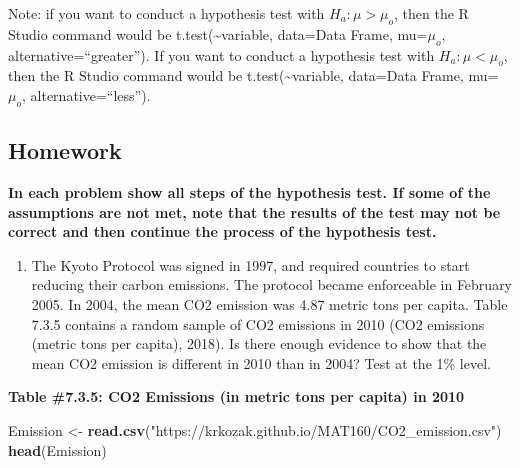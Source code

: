 \documentclass[]{book}
\newenvironment{Shaded}{\begin{snugshade}}{\end{snugshade}}
\newcommand{\KeywordTok}[1]{\textcolor[rgb]{0.13,0.29,0.53}{\textbf{#1}}}
\newcommand{\NormalTok}[1]{#1}
\newcommand{\StringTok}[1]{\textcolor[rgb]{0.31,0.60,0.02}{#1}}
\providecommand{\tightlist}{%
  \setlength{\itemsep}{0pt}\setlength{\parskip}{0pt}}
\begin{document}
Note: if you want to conduct a hypothesis test with \(H_a:\mu>\mu_o\), then the R Studio command would be t.test(\textasciitilde{}variable, data=Data Frame, mu=\(\mu_o\), alternative=``greater''). If you want to conduct a hypothesis test with \(H_a:\mu<\mu_o\), then the R Studio command would be t.test(\textasciitilde{}variable, data=Data Frame, mu=\(\mu_o\), alternative=``less'').

\hypertarget{homework-22}{%
\subsection{Homework}\label{homework-22}}

\textbf{In each problem show all steps of the hypothesis test. If some of the assumptions are not met, note that the results of the test may not be correct and then continue the process of the hypothesis test.}

\begin{enumerate}
\def\labelenumi{\arabic{enumi}.}
\tightlist
\item
  The Kyoto Protocol was signed in 1997, and required countries to start reducing their carbon emissions. The protocol became enforceable in February 2005. In 2004, the mean CO2 emission was 4.87 metric tons per capita. Table 7.3.5 contains a random sample of CO2 emissions in 2010 (CO2 emissions (metric tons per capita), 2018). Is there enough evidence to show that the mean CO2 emission is different in 2010 than in 2004? Test at the 1\% level.
\end{enumerate}

\textbf{Table \#7.3.5: CO2 Emissions (in metric tons per capita) in 2010}

\begin{Shaded}
\begin{Highlighting}[]
\NormalTok{Emission <-}\StringTok{ }\KeywordTok{read.csv}\NormalTok{(}\StringTok{"https://krkozak.github.io/MAT160/CO2_emission.csv"}\NormalTok{)}
\KeywordTok{head}\NormalTok{(Emission)}
\end{Highlighting}
\end{Shaded}
\end{document}
